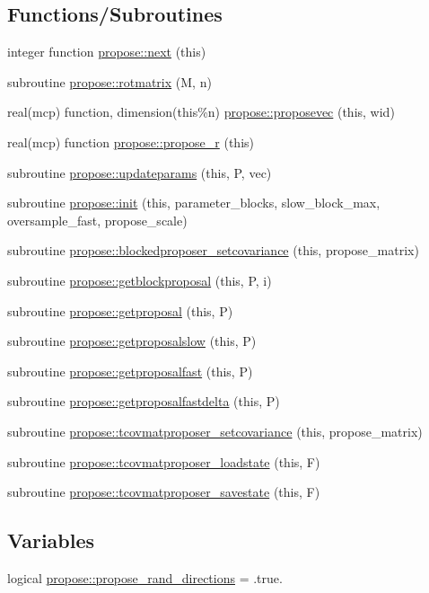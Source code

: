 \subsection*{Functions/\+Subroutines}
\begin{DoxyCompactItemize}
\item 
integer function \mbox{\hyperlink{namespacepropose_a57ab2c55501784356748335378f0ca91}{propose\+::next}} (this)
\item 
subroutine \mbox{\hyperlink{namespacepropose_a3315b3e0b92d1cf9fa29628d291634de}{propose\+::rotmatrix}} (M, n)
\item 
real(mcp) function, dimension(this\%n) \mbox{\hyperlink{namespacepropose_a2c9bb747ee6cc87964f354764f10d58c}{propose\+::proposevec}} (this, wid)
\item 
real(mcp) function \mbox{\hyperlink{namespacepropose_a5181089142665b7ba3e73b0e8517744c}{propose\+::propose\+\_\+r}} (this)
\item 
subroutine \mbox{\hyperlink{namespacepropose_aee79ab6a28983b4a95931840fa5592e3}{propose\+::updateparams}} (this, P, vec)
\item 
subroutine \mbox{\hyperlink{namespacepropose_a4a4f0ef5bf70846bd7b2274da1f889cb}{propose\+::init}} (this, parameter\+\_\+blocks, slow\+\_\+block\+\_\+max, oversample\+\_\+fast, propose\+\_\+scale)
\item 
subroutine \mbox{\hyperlink{namespacepropose_ad24a067fcde7527fedd0ecb5f3fac8c5}{propose\+::blockedproposer\+\_\+setcovariance}} (this, propose\+\_\+matrix)
\item 
subroutine \mbox{\hyperlink{namespacepropose_ad8938d5b08fd1352284320a465fa0dd1}{propose\+::getblockproposal}} (this, P, i)
\item 
subroutine \mbox{\hyperlink{namespacepropose_acc9c3d417d1630086e0f2e46eda9482c}{propose\+::getproposal}} (this, P)
\item 
subroutine \mbox{\hyperlink{namespacepropose_a593b61b41784923a7b85bc8a66c07ef8}{propose\+::getproposalslow}} (this, P)
\item 
subroutine \mbox{\hyperlink{namespacepropose_ac628bde62d39c32001cbd8b6a33fb2cc}{propose\+::getproposalfast}} (this, P)
\item 
subroutine \mbox{\hyperlink{namespacepropose_a336c9a51cd0387485ce6184eb753c720}{propose\+::getproposalfastdelta}} (this, P)
\item 
subroutine \mbox{\hyperlink{namespacepropose_a8f227417f812244dfc68539ff9b75353}{propose\+::tcovmatproposer\+\_\+setcovariance}} (this, propose\+\_\+matrix)
\item 
subroutine \mbox{\hyperlink{namespacepropose_aa4a55115a922af4c660ba77e969a2fc1}{propose\+::tcovmatproposer\+\_\+loadstate}} (this, F)
\item 
subroutine \mbox{\hyperlink{namespacepropose_a9a1013a605e00c63e36aa86ab4d4e938}{propose\+::tcovmatproposer\+\_\+savestate}} (this, F)
\end{DoxyCompactItemize}
\subsection*{Variables}
\begin{DoxyCompactItemize}
\item 
logical \mbox{\hyperlink{namespacepropose_a8617eeb66f67fd9a772122b9d90f4a03}{propose\+::propose\+\_\+rand\+\_\+directions}} = .true.
\end{DoxyCompactItemize}

